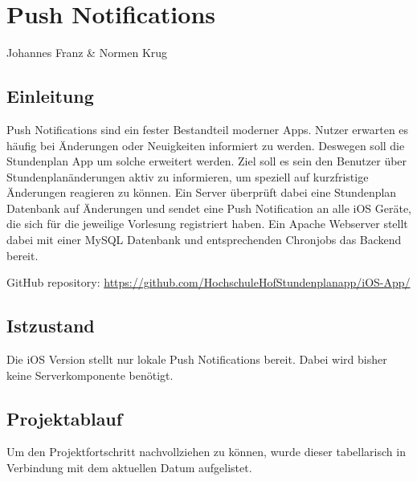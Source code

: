 \chapter{Push Notifications}
Johannes Franz \& Normen Krug

\section{Einleitung}
Push Notifications sind ein fester Bestandteil moderner Apps. Nutzer erwarten es häufig bei Änderungen oder Neuigkeiten informiert zu werden. Deswegen soll die Stundenplan App um solche erweitert werden. Ziel soll es sein den Benutzer über Stundenplanänderungen aktiv zu informieren, um speziell auf kurzfristige Änderungen reagieren zu können. Ein Server überprüft dabei eine Stundenplan Datenbank auf Änderungen und sendet eine Push Notification an alle iOS Geräte, die sich für die jeweilige Vorlesung registriert haben. Ein Apache Webserver stellt dabei mit einer MySQL Datenbank und entsprechenden Chronjobs das Backend bereit.

GitHub repository: \url{https://github.com/HochschuleHofStundenplanapp/iOS-App/}


\section{Istzustand}
Die iOS Version stellt nur lokale Push Notifications bereit. Dabei wird bisher keine Serverkomponente benötigt.

\newpage

\section{Projektablauf}
Um den Projektfortschritt nachvollziehen zu können, wurde dieser tabellarisch in Verbindung mit dem aktuellen Datum aufgelistet.


